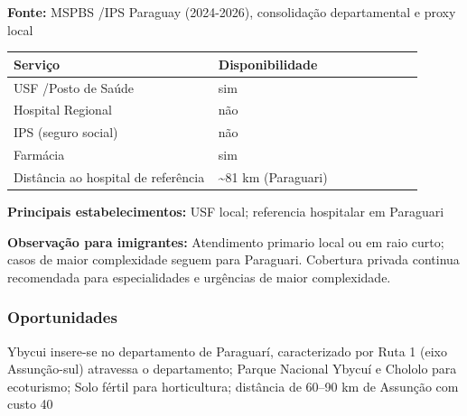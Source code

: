 \textbf{Fonte:} MSPBS /\allowbreak  IPS Paraguay (2024-2026), consolidação
departamental e proxy local

{\def\LTcaptype{none} %
\begin{longtable}{@{}>{\raggedright\arraybackslash}p{0.45\linewidth} >{\raggedright\arraybackslash}p{0.45\linewidth}@{}}
\toprule\noalign{}
Serviço & Disponibilidade \\
\midrule\noalign{}
\endhead
\bottomrule\noalign{}
\endlastfoot
USF /\allowbreak  Posto de Saúde & sim \\
Hospital Regional & não \\
IPS (seguro social) & não \\
Farmácia & sim \\
Distância ao hospital de referência & \textasciitilde81 km
(Paraguari) \\
\end{longtable}
}

\textbf{Principais estabelecimentos:} USF local; referencia hospitalar
em Paraguari

\textbf{Observação para imigrantes:} Atendimento primario local ou em
raio curto; casos de maior complexidade seguem para Paraguari. Cobertura
privada continua recomendada para especialidades e urgências de maior
complexidade.
\newpage

\subsubsection*{Oportunidades}\label{oport-ybycui-0916}
Ybycui insere-se no departamento de Paraguarí, caracterizado por Ruta 1 (eixo Assunção-sul) atravessa o departamento; Parque Nacional Ybycuí e Chololo para ecoturismo; Solo fértil para horticultura; distância de 60–90 km de Assunção com custo 40%

